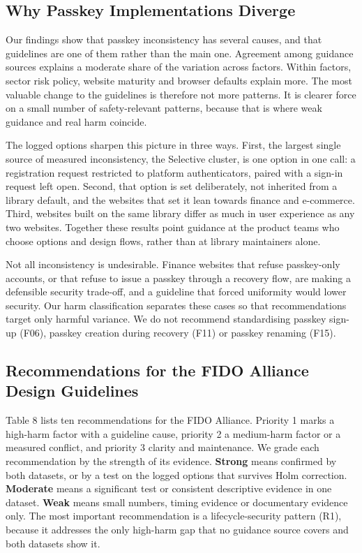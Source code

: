 \documentclass[letterpaper,twocolumn,10pt]{article}
\begin{document}
\subsection{Why Passkey Implementations Diverge}

Our findings show that passkey inconsistency has several causes, and that guidelines are one of them rather than the main one. Agreement among guidance sources explains a moderate share of the variation across factors. Within factors, sector risk policy, website maturity and browser defaults explain more. The most valuable change to the guidelines is therefore not more patterns. It is clearer force on a small number of safety-relevant patterns, because that is where weak guidance and real harm coincide.

The logged options sharpen this picture in three ways. First, the largest single source of measured inconsistency, the Selective cluster, is one option in one call: a registration request restricted to platform authenticators, paired with a sign-in request left open. Second, that option is set deliberately, not inherited from a library default, and the websites that set it lean towards finance and e-commerce. Third, websites built on the same library differ as much in user experience as any two websites. Together these results point guidance at the product teams who choose options and design flows, rather than at library maintainers alone.

Not all inconsistency is undesirable. Finance websites that refuse passkey-only accounts, or that refuse to issue a passkey through a recovery flow, are making a defensible security trade-off, and a guideline that forced uniformity would lower security. Our harm classification separates these cases so that recommendations target only harmful variance. We do not recommend standardising passkey sign-up (F06), passkey creation during recovery (F11) or passkey renaming (F15).

\subsection{Recommendations for the FIDO Alliance Design Guidelines}

Table 8 lists ten recommendations for the FIDO Alliance. Priority 1 marks a high-harm factor with a guideline cause, priority 2 a medium-harm factor or a measured conflict, and priority 3 clarity and maintenance. We grade each recommendation by the strength of its evidence. \textbf{Strong} means confirmed by both datasets, or by a test on the logged options that survives Holm correction. \textbf{Moderate} means a significant test or consistent descriptive evidence in one dataset. \textbf{Weak} means small numbers, timing evidence or documentary evidence only. The most important recommendation is a lifecycle-security pattern (R1), because it addresses the only high-harm gap that no guidance source covers and both datasets show it.
\end{document}
